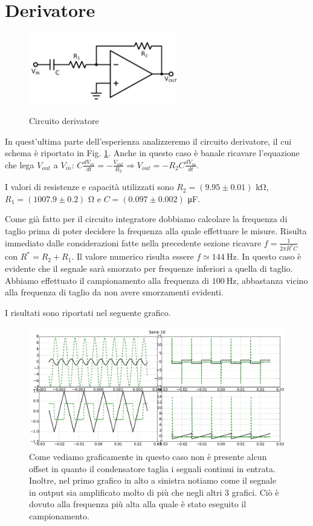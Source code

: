 \section{Derivatore}

\begin{figure}
	\caption{Circuito derivatore}
	\includegraphics[width=65mm]{ccder.pdf}
	\label{fig:ccder}
\end{figure}

In quest'ultima parte dell'esperienza analizzeremo il circuito derivatore, il cui schema è riportato in Fig. \ref{fig:ccder}.
Anche in questo caso è banale ricavare l'equazione che lega $V_{out}$ a $V_{in}$: $C\frac{dV_{in}}{dt}=-\frac{V_{out}}{R_2}\Rightarrow V_{out}=-R_2C\frac{dV_{in}}{dt}$.

I valori di resistenze e capacità utilizzati sono $R_2=(9.95 \pm 0.01)$ \si{\kilo\ohm}, $R_1=(1007.9 \pm 0.2)$ \si{\ohm} e $C=(0.097 \pm 0.002)$ \si{\micro\farad}.

Come già fatto per il circuito integratore dobbiamo calcolare la frequenza di taglio prima di poter decidere la frequenza alla quale effettuare le misure.
Risulta immediato dalle considerazioni fatte nella precedente sezione ricavare $f=\frac{1}{2 \pi R^* C}$ con $R^*=R_2+R_1$.
Il valore numerico risulta essere $f \simeq \SI{144}{\hertz}$.
In questo caso è evidente che il segnale sarà smorzato per frequenze inferiori a quella di taglio. Abbiamo effettuato il campionamento alla frequenza di $\SI{100}{\hertz}$, abbastanza vicino alla frequenza di taglio da non avere smorzamenti evidenti.

I risultati sono riportati nel seguente grafico.

\begin{figure}[h]
	\centering
			\includegraphics[width=.9\textwidth]{der_serie_10.pdf}
			\caption{Come vediamo graficamente in questo caso non è presente alcun offset in quanto il condensatore taglia i segnali continui in entrata. Inoltre, nel primo grafico in alto a sinistra notiamo come il segnale in output sia amplificato molto di più che negli altri 3 grafici. Ciò è dovuto alla frequenza più alta alla quale è stato eseguito il campionamento.}
			\label{fig:der}
\end{figure}

